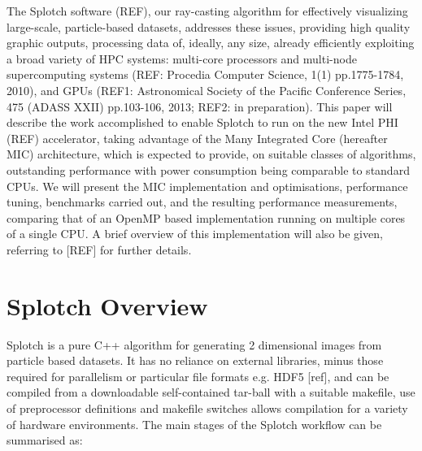 \documentclass[runningheads,a4paper]{llncs}
\newcommand{\comm}[1]{}
\begin{document}
The Splotch software (REF), our ray-casting algorithm for
effectively visualizing large-scale, particle-based datasets, addresses these issues, 
providing high quality graphic outputs, processing data of, ideally, any size, already
efficiently exploiting a broad variety of HPC systems: multi-core processors and multi-node supercomputing systems 
(REF: Procedia Computer Science, 1(1) pp.1775-1784, 2010), and GPUs (REF1: Astronomical Society of the Pacific Conference 
Series, 475 (ADASS XXII) pp.103-106, 2013; REF2: in preparation). 
This paper will describe the work accomplished to enable Splotch to 
run on the new Intel PHI (REF) accelerator, taking advantage of the Many Integrated Core (hereafter MIC) architecture,
which is expected to provide, on suitable classes of algorithms, outstanding performance 
with power consumption being comparable to standard CPUs. 
We will present the MIC implementation and optimisations, performance tuning,
benchmarks carried out, and the resulting performance measurements, comparing that of an OpenMP
based implementation running on multiple cores of a single CPU. 
A brief overview of this implementation will also be given, referring to [REF] for further details.

\section{Splotch Overview}
\label{sect:overview}

\comm{This section gives a brief overview to the Splotch algorithm, along with a description of the MPI and OpenMP related 
functionality for reference as these are key to the development of the MIC implementation.}

Splotch is a pure C++ algorithm for generating 2 dimensional images from particle based datasets. It has no reliance 
on external libraries, minus those required for parallelism or particular file formats e.g. HDF5 [ref], and can be 
compiled from a downloadable self-contained tar-ball with a suitable makefile, use of preprocessor definitions and 
makefile switches allows compilation for a variety of hardware environments. The main stages of the Splotch workflow 
can be summarised as:
\end{document}
